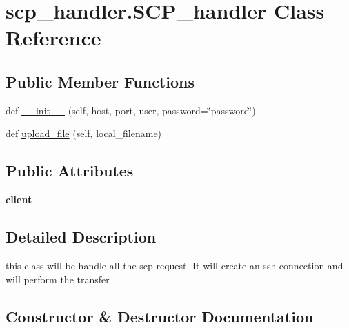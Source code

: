 \hypertarget{classscp__handler_1_1SCP__handler}{}\section{scp\+\_\+handler.\+S\+C\+P\+\_\+handler Class Reference}
\label{classscp__handler_1_1SCP__handler}
\subsection*{Public Member Functions}
\begin{DoxyCompactItemize}
\item 
def \hyperlink{classscp__handler_1_1SCP__handler_ad6b1c2ed42208324e25394f895752851}{\+\_\+\+\_\+init\+\_\+\+\_\+} (self, host, port, user, password=\char`\"{}password\char`\"{})
\item 
def \hyperlink{classscp__handler_1_1SCP__handler_a4441d5d1a6dbc37f394ba21a1d8a0ee2}{upload\+\_\+file} (self, local\+\_\+filename)
\end{DoxyCompactItemize}
\subsection*{Public Attributes}
\begin{DoxyCompactItemize}
\item 
\mbox{\label{classscp__handler_1_1SCP__handler_a4e8a17da2ea659fb007e1feb681083b6}} 
{\bfseries client}
\end{DoxyCompactItemize}


\subsection{Detailed Description}
\begin{DoxyVerb}this class will be handle all the scp request. It will create an ssh 
connection and will perform the transfer
\end{DoxyVerb}
 

\subsection{Constructor \& Destructor Documentation}
\mbox{\label{classscp__handler_1_1SCP__handler_ad6b1c2ed42208324e25394f895752851}} 
